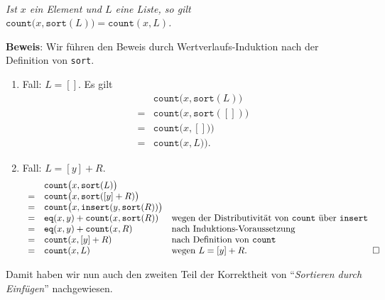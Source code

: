 \begin{Satz} \hspace*{\fill}\\
{\em
  Ist $x$ ein Element und $L$ eine Liste, so gilt \\[0.1cm]
  \hspace*{1.3cm} $\texttt{count}\bigl(x, \texttt{sort}(L) \bigr) = \texttt{count}(x,L)$.
}
\end{Satz}

\noindent
\textbf{Beweis}: Wir f\"uhren den Beweis durch Wertverlaufs-Induktion nach der Definition von \texttt{sort}.
\begin{enumerate}
\item Fall: $L = []$. Es gilt
      $$
      \begin{array}{cll}
        & \mathtt{count}\bigl(x, \mathtt{sort}( L) \bigr) \\
      = & \mathtt{count}\bigl(x, \mathtt{sort}([]) \bigr) \\
      = & \mathtt{count}\bigl(x, []) \bigr) \\
      = & \mathtt{count}\bigl(x, L) \bigr). 
      \end{array}
      $$
\item Fall: $L = [y] + R$. 
        $$
      \begin{array}[b]{cll}
        & \mathtt{count}\bigl(x, \mathtt{sort}(L) \bigr) \\
      = & \mathtt{count}\bigl(x, \mathtt{sort}([y] + R) \bigr) \\
      = & \mathtt{count}\bigl(x, \mathtt{insert}(y, \mathtt{sort}(R)) \bigr) \\
      = & \mathtt{eq}(x,y) + \mathtt{count}(x,\mathtt{sort}(R)) &
         \mbox{wegen der Distributivit\"at von \texttt{count} \"uber \texttt{insert}} \\
      = & \mathtt{eq}(x,y) + \mathtt{count}(x,R) &
         \mbox{nach Induktions-Voraussetzung} \\
      = & \mathtt{count}(x,[y] + R) &
         \mbox{nach Definition von \texttt{count}} \\
      = & \mathtt{count}(x,L) &
         \mbox{wegen $L = [y] + R$.}
      \end{array}\hspace*{\fill} \Box
      $$
\end{enumerate}
Damit haben wir nun auch den zweiten Teil der Korrektheit von  
``\emph{Sortieren durch Einf\"ugen}'' nachgewiesen.

